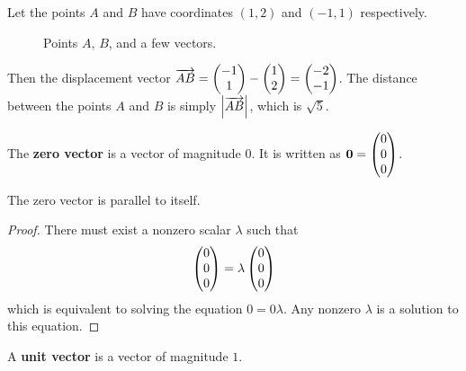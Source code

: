 \documentclass[12pt]{article}
\renewcommand{\vec}{\mathbf}
\begin{document}
\begin{eg}
	Let the points \(A\) and \(B\) have coordinates \((1,2)\) and \((-1,1)\) respectively.
	\begin{figure}[H]
		\centering
		\caption{Points \(A\), \(B\), and a few vectors.}
		\label{fig:OAB}
	\end{figure}
	Then the displacement vector \(\overrightarrow{AB} = \cvec{-1 \\ 1} - \cvec{1 \\ 2} = \cvec{-2 \\ -1}\). 
	The distance between the points \(A\) and \(B\) is simply \(\abs*{\overrightarrow{AB}}\), which is \(\sqrt{5}\).
\end{eg}

\begin{defn} \label{defn:zv}
	The \textbf{zero vector} is a vector of magnitude \(0\).
	It is written as \(\vec{0} = \cvec{0 \\ 0 \\ 0}\).
\end{defn}

\begin{prop}
	The zero vector is parallel to itself.
\end{prop}

\begin{proof}
	There must exist a nonzero scalar \(\lambda\) such that 
	\[ \cvec{0 \\ 0 \\ 0} = \lambda \cvec{0 \\ 0 \\ 0} \] 
	which is equivalent to solving the equation \(0 = 0 \lambda\).
	Any nonzero \(\lambda\) is a solution to this equation.
\end{proof}

\begin{defn}
	A \textbf{unit vector} is a vector of magnitude \(1\).
\end{defn}
\end{document}
